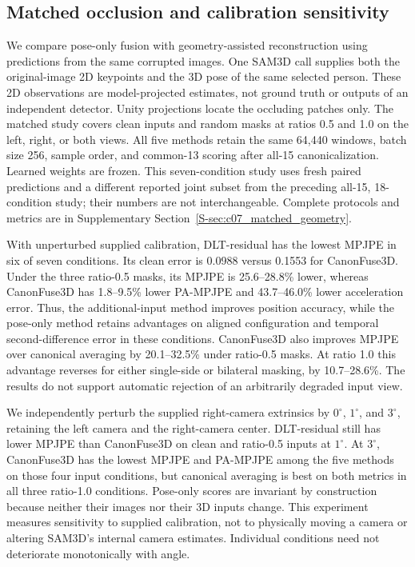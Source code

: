 \subsection{Matched occlusion and calibration sensitivity}
\label{subsec:matched_geometry}

We compare pose-only fusion with geometry-assisted reconstruction using predictions from the same corrupted images. One SAM3D call supplies both the original-image 2D keypoints and the 3D pose of the same selected person. These 2D observations are model-projected estimates, not ground truth or outputs of an independent detector. Unity projections locate the occluding patches only. The matched study covers clean inputs and random masks at ratios 0.5 and 1.0 on the left, right, or both views. All five methods retain the same 64,440 windows, batch size 256, sample order, and common-13 scoring after all-15 canonicalization. Learned weights are frozen. This seven-condition study uses fresh paired predictions and a different reported joint subset from the preceding all-15, 18-condition study; their numbers are not interchangeable. Complete protocols and metrics are in Supplementary Section~\ref{S-sec:c07_matched_geometry}.



With unperturbed supplied calibration, DLT-residual has the lowest MPJPE in six of seven conditions. Its clean error is 0.0988 versus 0.1553 for CanonFuse3D. Under the three ratio-0.5 masks, its MPJPE is 25.6--28.8\% lower, whereas CanonFuse3D has 1.8--9.5\% lower PA-MPJPE and 43.7--46.0\% lower acceleration error. Thus, the additional-input method improves position accuracy, while the pose-only method retains advantages on aligned configuration and temporal second-difference error in these conditions. CanonFuse3D also improves MPJPE over canonical averaging by 20.1--32.5\% under ratio-0.5 masks. At ratio 1.0 this advantage reverses for either single-side or bilateral masking, by 10.7--28.6\%. The results do not support automatic rejection of an arbitrarily degraded input view.



We independently perturb the supplied right-camera extrinsics by $0^\circ$, $1^\circ$, and $3^\circ$, retaining the left camera and the right-camera center. DLT-residual still has lower MPJPE than CanonFuse3D on clean and ratio-0.5 inputs at $1^\circ$. At $3^\circ$, CanonFuse3D has the lowest MPJPE and PA-MPJPE among the five methods on those four input conditions, but canonical averaging is best on both metrics in all three ratio-1.0 conditions. Pose-only scores are invariant by construction because neither their images nor their 3D inputs change. This experiment measures sensitivity to supplied calibration, not to physically moving a camera or altering SAM3D's internal camera estimates. Individual conditions need not deteriorate monotonically with angle.

